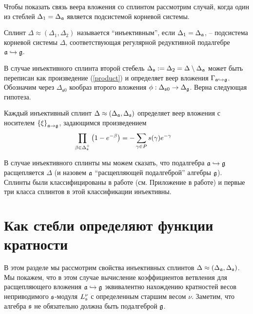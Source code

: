 Чтобы показать связь веера вложения со сплинтом рассмотрим случай, когда один из стеблей $\Delta _{1}=\Delta _{\mathfrak{a}}$  является подсистемой корневой системы. 

Сплинт $\Delta \approx (\Delta _{1},\Delta _{2})$ называется ``инъективным'', если $\Delta _{1}=\Delta _{\mathfrak{a}}$, -- подсистема корневой системы $\Delta $, соответствующая регулярной редуктивной подалгебре $\mathfrak{a}\hookrightarrow \mathfrak{g}$. 

В случае инъективного сплинта второй стебель $\Delta _{\mathfrak{s}}:=\Delta_{2}=\Delta \setminus \Delta _{\mathfrak{a}}$ может быть переписан как произведение (\ref{product}) и определяет веер вложения  $\Gamma _{\mathfrak{a}\hookrightarrow \mathfrak{g}}$. Обозначим через $\Delta_{\mathfrak{s}0}$ кообраз второго вложения $\phi:\Delta_{\mathfrak{s}0}\to \Delta_{\mathfrak{g}}$. Верна следующая гипотеза.

\begin{Cnj}
Каждый инъективный сплинт $\Delta \approx (\Delta _{\mathfrak{a}},\Delta _{\mathfrak{s}})$ определяет веер вложения с носителем $\left\{ \xi \right\} _{\mathfrak{a}\rightarrow \mathfrak{g}}$, задающимся произведением
\begin{equation}
\prod_{\beta \in \Delta _{\mathfrak{s}}^{+}}\left( 1-e^{-\beta }\right)
=-\sum_{\gamma \in P}s(\gamma )e^{-\gamma }\quad   \label{splint product}
\end{equation}
\end{Cnj}

В случае инъективного сплинты мы можем сказать, что подалгебра $\mathfrak{a}\hookrightarrow \mathfrak{g}$ расщепляется $\Delta$ (и назовем $\mathfrak{a}$ ``расщепляющей подалгеброй'' алгебры $\mathfrak{g}$).  Сплинты были классифицированы в работе \cite{richter2008splints}  (см. Приложение в работе) и первые три класса сплинтов в этой классификации инъективны. 

\section{Как стебли определяют функции кратности}

\label{sec:stems and multiplicity functions}

В этом разделе мы рассмотрим свойства инъективных сплинтов $\Delta \approx (\Delta _{\mathfrak{a}},\Delta _{\mathfrak{s}})$. Мы покажем, что в этом случае вычисление коэффициентов ветвления для расщепляющего вложения $\mathfrak{a}\hookrightarrow\mathfrak{g}$ эквивалентно нахождению кратностей весов неприводимого $\mathfrak{s}$-модуля $L_{\mathfrak{s}}^{\nu }$ с определенным старшим весом $\nu $. Заметим, что алгебра $\mathfrak{s}$ не обязательно должна быть подалгеброй $\mathfrak{g}$.

